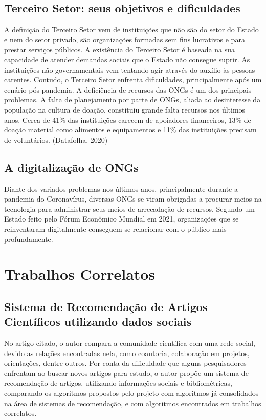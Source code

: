 \documentclass[conference]{IEEEtran}
\begin{document}
\subsection{Terceiro Setor: seus objetivos e dificuldades}
A definição do Terceiro Setor vem de instituições que não são do setor do Estado e nem do setor privado, são organizações formadas sem fins lucrativos e para prestar serviços públicos. \cite{sitepolitize02} A existência do Terceiro Setor é baseada na sua capacidade de atender demandas sociais que o Estado não consegue suprir. As instituições não governamentais vem tentando agir através do auxílio às pessoas carentes. \cite{silva2020dificuldades} Contudo, o Terceiro Setor enfrenta dificuldades, principalmente após um cenário pós-pandemia.
A deficiência de recursos das ONGs é um dos principais problemas. A falta de planejamento por parte de ONGs, aliada ao desinteresse da população na cultura de doação, constituiu grande falta recursos nos últimos anos. Cerca de 41\% das instituições carecem de apoiadores financeiros, 13\% de doação material como alimentos e equipamentos e 11\% das instituições precisam de voluntários. (Datafolha, 2020)


\subsection{A digitalização de ONGs}
Diante dos variados problemas nos últimos anos, principalmente durante a pandemia do Coronavírus, diversas ONGs se viram obrigadas a procurar meios na tecnologia para administrar seus meios de arrecadação de recursos. Segundo um Estado feito pelo Fórum Econômico Mundial em 2021, organizações que se reinventaram digitalmente conseguem se relacionar com o público mais profundamente. \cite{siteimpacto} \cite{economicforum}

\section{Trabalhos Correlatos}

\subsection{Sistema de Recomendação de Artigos Científicos utilizando dados sociais}
No artigo citado, o autor compara a comunidade científica com uma rede social, devido as relações encontradas nela, como coautoria,
colaboração em projetos, orientações, dentre outros. Por conta da
dificuldade que alguns pesquisadores enfrentam ao buscar novos
artigos para estudo, o autor propõe um sistema de recomendação de
artigos, utilizando informações sociais e bibliométricas, comparando
os algoritmos propostos pelo projeto com algoritmos já consolidados
na área de sistemas de recomendação, e com algoritmos encontrados
em trabalhos correlatos. \cite{grava2021sistema}
\end{document}
